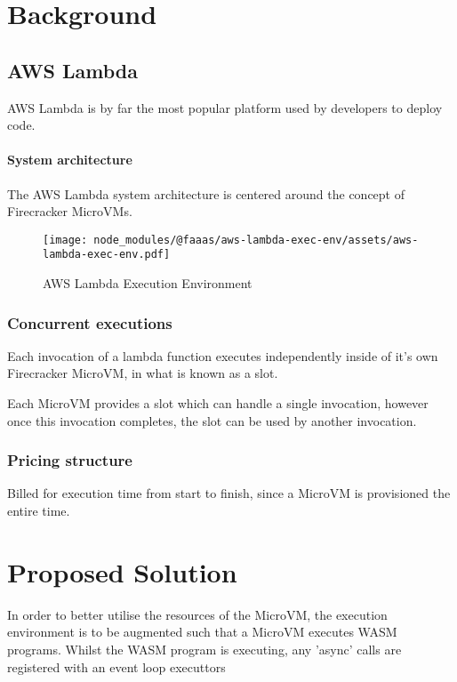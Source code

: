 \chapter{Background}

\section{AWS Lambda}

AWS Lambda is by far the most popular \faas{} platform used by developers to deploy code.

\subsubsection{System architecture}

The AWS Lambda system architecture is centered around the concept of Firecracker MicroVMs\cite{firecracker-microvm}.

\begin{figure*}[t]
    \texttt{[image: node\_modules/@faaas/aws-lambda-exec-env/assets/aws-lambda-exec-env.pdf]}
    \caption{AWS Lambda Execution Environment}
    \label{fig:aws-lambda-exec-env}
\end{figure*}

\subsection{Concurrent executions}

Each invocation of a lambda function executes independently inside of it's own Firecracker MicroVM, in what is known as a slot.

Each MicroVM provides a slot which can handle a single invocation, however once this invocation completes, the slot can be used by another invocation.

\subsection{Pricing structure}

Billed for execution time from start to finish, since a MicroVM is provisioned the entire time.

\chapter{Proposed Solution}

In order to better utilise the resources of the MicroVM, the execution environment is to be augmented such that a MicroVM executes WASM programs. Whilst the WASM program is executing, any 'async' calls are registered with an event loop executtors
